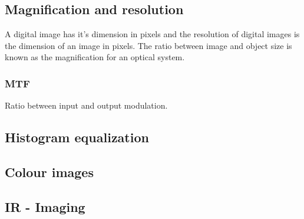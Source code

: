 \subsection{Magnification and resolution}
A digital image has it's dimension in pixels and the resolution of digital images is the dimension of an image in pixels.
The ratio between image and object size is known as the magnification for an optical system. 

\subsubsection{MTF}
Ratio between input and output modulation. 

\subsection{Histogram equalization}

\subsection{Colour images}

\subsection{IR - Imaging}